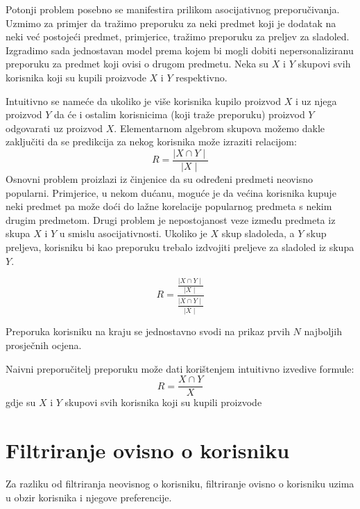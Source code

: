 \documentclass[times, utf8, diplomski, numeric]{fer}
\begin{document}
Potonji problem posebno se manifestira prilikom asocijativnog preporučivanja.
Uzmimo za primjer da tražimo preporuku za neki predmet koji je dodatak na neki
već postojeći predmet, primjerice, tražimo preporuku za preljev za sladoled.
Izgradimo sada jednostavan model prema kojem bi mogli dobiti nepersonaliziranu
preporuku za predmet koji ovisi o drugom predmetu. Neka su $X$ i $Y$ skupovi
svih korisnika koji su kupili proizvode $X$ i $Y$ respektivno.

Intuitivno se nameće da ukoliko je više korisnika kupilo proizvod $X$ i uz njega
proizvod $Y$ da će i ostalim korisnicima (koji traže preporuku) proizvod $Y$
odgovarati uz proizvod $X$. Elementarnom algebrom skupova možemo dakle
zaključiti da se predikcija za nekog korisnika može izraziti relacijom:
\begin{equation}
\label{eq:naivnaNepersonaliziraniTemp}
	R = \frac{\mid X \cap Y \mid}{\mid X \mid}
\end{equation}
Osnovni problem proizlazi iz činjenice da su određeni predmeti neovisno
popularni. Primjerice, u nekom dućanu, moguće je da većina korisnika kupuje neki
predmet pa može doći do lažne korelacije popularnog predmeta s nekim drugim
predmetom. Drugi problem je nepostojanost veze između predmeta iz skupa $X$ i
$Y$ u smislu asocijativnosti. Ukoliko je $X$ skup sladoleda, a $Y$ skup
preljeva, korisniku bi kao preporuku trebalo izdvojiti preljeve za sladoled iz
skupa $Y$. 

\begin{equation}
\label{eq:nepersonalizirani}
	R = \frac
		{\frac
			{\mid X \cap Y \mid}
			{\mid X \mid}}
		{\frac
			{\mid \overline{X} \cap Y\mid}
			{\mid \overline{X} \mid}}
\end{equation}

Preporuka korisniku na kraju se jednostavno svodi na prikaz prvih $N$ najboljih
prosječnih ocjena.

Naivni preporučitelj preporuku može dati korištenjem intuitivno izvedive
formule:
\begin{equation}
\label{eq:naivnaNepersonalizirani}
	R = \frac{X \cap Y}{X}
\end{equation}
gdje su $X$ i $Y$ skupovi svih korisnika koji su kupili proizvode 

\section{Filtriranje ovisno o korisniku}
Za razliku od filtriranja neovisnog o korisniku, filtriranje ovisno o korisniku
uzima u obzir korisnika i njegove preferencije.
\end{document}
